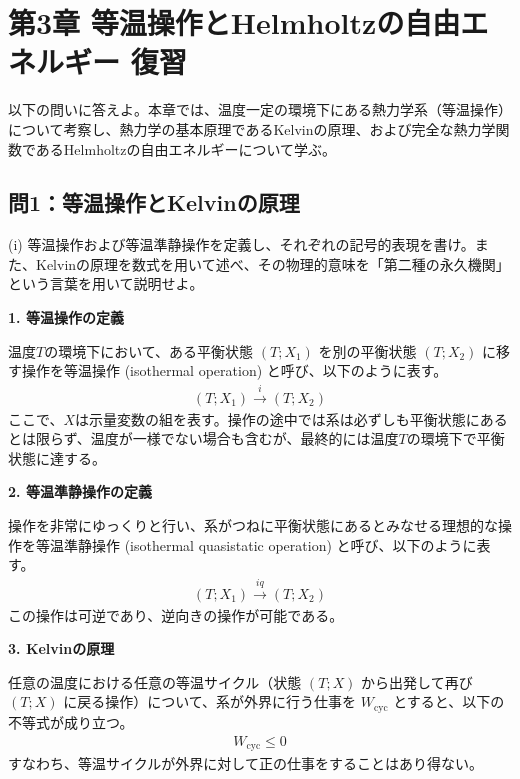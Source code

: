 \documentclass[a4paper,12pt]{jlreq}
\begin{document}
\section*{第3章 等温操作とHelmholtzの自由エネルギー 復習}

以下の問いに答えよ。本章では、温度一定の環境下にある熱力学系（等温操作）について考察し、熱力学の基本原理であるKelvinの原理、および完全な熱力学関数であるHelmholtzの自由エネルギーについて学ぶ。

\subsection*{問1：等温操作とKelvinの原理}

\begin{itembox}[l]{(i)}
  等温操作および等温準静操作を定義し、それぞれの記号的表現を書け。また、Kelvinの原理を数式を用いて述べ、その物理的意味を「第二種の永久機関」という言葉を用いて説明せよ。
\end{itembox}

\vspace{5mm}

\par
\textbf{1. 等温操作の定義} \par
温度$T$の環境下において、ある平衡状態 $(T; X_1)$ を別の平衡状態 $(T; X_2)$ に移す操作を等温操作 (isothermal operation) と呼び、以下のように表す。
\begin{align}
  (T; X_1) \xrightarrow{i} (T; X_2)
\end{align}
ここで、$X$は示量変数の組を表す。操作の途中では系は必ずしも平衡状態にあるとは限らず、温度が一様でない場合も含むが、最終的には温度$T$の環境下で平衡状態に達する。

\textbf{2. 等温準静操作の定義} \par
操作を非常にゆっくりと行い、系がつねに平衡状態にあるとみなせる理想的な操作を等温準静操作 (isothermal quasistatic operation) と呼び、以下のように表す。
\begin{align}
  (T; X_1) \xrightarrow{iq} (T; X_2)
\end{align}
この操作は可逆であり、逆向きの操作が可能である。

\textbf{3. Kelvinの原理} \par
任意の温度における任意の等温サイクル（状態 $(T; X)$ から出発して再び $(T; X)$ に戻る操作）について、系が外界に行う仕事を $W_{\text{cyc}}$ とすると、以下の不等式が成り立つ。
\begin{align}
  W_{\text{cyc}} \le 0
\end{align}
すなわち、等温サイクルが外界に対して正の仕事をすることはあり得ない。
\end{document}
